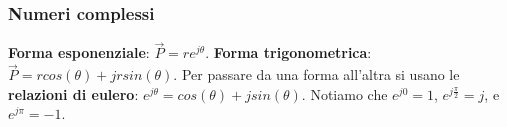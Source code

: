 \subsubsection{Numeri complessi}
\textbf{Forma esponenziale}: $\vec{P} = r e^{j \theta}$.\newline
\textbf{Forma trigonometrica}: $\vec{P} = r cos(\theta) + j r sin(\theta)$.\newline
\newline
Per passare da una forma all'altra si usano le \textbf{relazioni di eulero}: $e^{j \theta} = cos(\theta) + j sin(\theta)$.\newline
\newline
Notiamo che $e^{j 0} = 1$, $e^{j \frac{\pi}{2}} = j$, e $e^{j \pi} = -1$.